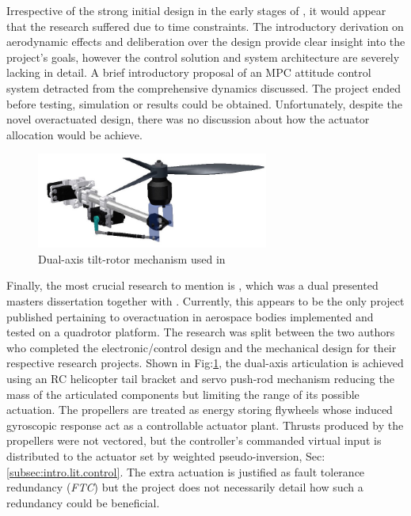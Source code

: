 \par
Irrespective of the strong initial design in the early stages of \cite{napsholm}, it would appear that the research suffered due to time constraints. The introductory derivation on aerodynamic effects and deliberation over the design provide clear insight into the project's goals, however the control solution and system architecture are severely lacking in detail. A brief introductory proposal of an MPC attitude control system detracted from the comprehensive dynamics discussed. The project ended before testing, simulation or results could be obtained. Unfortunately, despite the novel overactuated design, there was no discussion about how the actuator allocation would be achieve.
\par
\begin{figure}[htbp]
\vspace{-10pt}
\centering
\includegraphics[width=0.68\textwidth]{figs/gasco-mech}
\vspace{-14pt}
\caption{Dual-axis tilt-rotor mechanism used in \cite{tiltgasco}}
\label{fig:tiltrotor-gasco}
\vspace{-10pt}
\end{figure}
Finally, the most crucial research to mention is \cite{tiltgasco}, which was a dual presented masters dissertation together with \cite{tiltrihani}. Currently, this appears to be the only project published pertaining to overactuation in aerospace bodies implemented and tested on a quadrotor platform. The research was split between the two authors who completed the electronic/control design and the mechanical design for their respective research projects. Shown in Fig:\ref{fig:tiltrotor-gasco}, the dual-axis articulation is achieved using an RC helicopter tail bracket and servo push-rod mechanism reducing the mass of the articulated components but limiting the range of its possible actuation. The propellers are treated as energy storing flywheels whose induced gyroscopic response act as a controllable actuator plant. Thrusts produced by the propellers were not vectored, but the controller's commanded virtual input is distributed to the actuator set by weighted pseudo-inversion, Sec:\ref{subsec:intro.lit.control}. The extra actuation is justified as fault tolerance redundancy (\emph{FTC}) but the project does not necessarily detail how such a redundancy could be beneficial.
